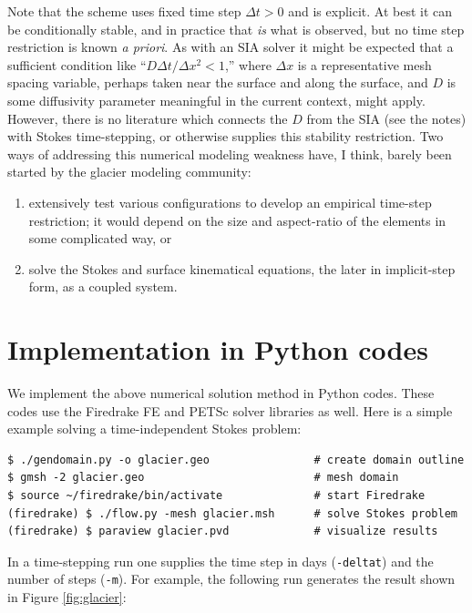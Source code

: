 \documentclass[letterpaper,final,12pt,reqno]{amsart}
\begin{document}
Note that the scheme uses fixed time step $\Delta t > 0$ and is explicit.  At best it can be conditionally stable, and in practice that \emph{is} what is observed, but no time step restriction is known \emph{a priori}.  As with an SIA solver it might be expected that a sufficient condition like ``$D\Delta t / \Delta x^2 < 1$,'' where $\Delta x$ is a representative mesh spacing variable, perhaps taken near the surface and along the surface, and $D$ is some diffusivity parameter meaningful in the current context, might apply.  However, there is no literature which connects the $D$ from the SIA (see the notes) with Stokes time-stepping, or otherwise supplies this stability restriction.  Two ways of addressing this numerical modeling weakness have, I think, barely been started by the glacier modeling community:
\renewcommand{\labelenumi}{(\roman{enumi})}
\begin{enumerate}
\item extensively test various configurations to develop an empirical time-step restriction; it would depend on the size and aspect-ratio of the elements in some complicated way, or
\item solve the Stokes and surface kinematical equations, the later in implicit-step form, as a coupled system.
\end{enumerate}


\section{Implementation in Python codes} \label{sec:implementation}

We implement the above numerical solution method in Python codes.  These codes use the Firedrake FE \cite{Rathgeberetal2016} and PETSc solver libraries \cite{Balayetal2018,BuelerBook} as well.  Here is a simple example solving a time-independent Stokes problem:

\medskip
\begin{Verbatim}
$ ./gendomain.py -o glacier.geo                # create domain outline
$ gmsh -2 glacier.geo                          # mesh domain
$ source ~/firedrake/bin/activate              # start Firedrake
(firedrake) $ ./flow.py -mesh glacier.msh      # solve Stokes problem
(firedrake) $ paraview glacier.pvd             # visualize results
\end{Verbatim}

\medskip
\noindent In a time-stepping run one supplies the time step in days (\texttt{-deltat}) and the number of steps (\texttt{-m}).  For example, the following run generates the result shown in Figure \ref{fig:glacier}:
\end{document}
